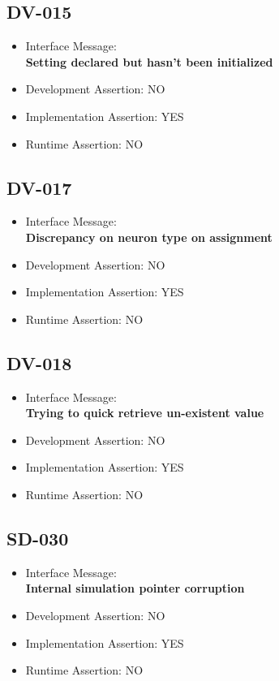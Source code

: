 \subsection{DV-015}
\begin{itemize}
  \item Interface Message:\\[1em]\textbf{Setting declared but hasn't been initialized}
  \item Development Assertion: NO
  \item Implementation Assertion: YES
  \item Runtime Assertion: NO
\end{itemize}

\subsection{DV-017}
\begin{itemize}
  \item Interface Message:\\[1em]\textbf{Discrepancy on neuron type on assignment}
  \item Development Assertion: NO
  \item Implementation Assertion: YES
  \item Runtime Assertion: NO
\end{itemize}

\subsection{DV-018}
\begin{itemize}
  \item Interface Message:\\[1em]\textbf{Trying to quick retrieve un-existent value}
  \item Development Assertion: NO
  \item Implementation Assertion: YES
  \item Runtime Assertion: NO
\end{itemize}

\subsection{SD-030}
\begin{itemize}
  \item Interface Message:\\[1em]\textbf{Internal simulation pointer corruption}
  \item Development Assertion: NO
  \item Implementation Assertion: YES
  \item Runtime Assertion: NO
\end{itemize}

